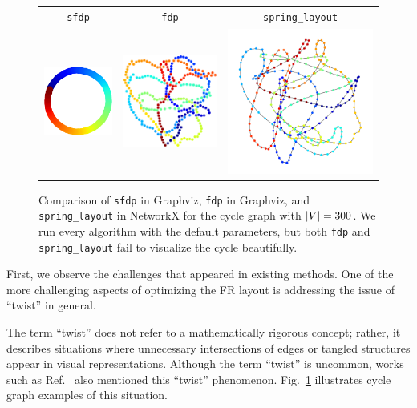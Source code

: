 \documentclass[dvipdfmx,journal]{IEEEtran}
\begin{document}
\begin{figure}[t]
  \centering
  \begin{tabular}{ccc}
    \texttt{sfdp}                                                   & \texttt{fdp} & \texttt{spring\_layout} \\
    \includegraphics[width=0.273\columnwidth]{cycle/cycle_sfdp.png} &
    \includegraphics[width=0.273\columnwidth]{cycle/cycle_fdp.png}  &
    \includegraphics[width=0.273\columnwidth]{cycle/cycle_fr.png}                                            \\
  \end{tabular}
  \caption{
    Comparison of \texttt{sfdp} in Graphviz, \texttt{fdp} in Graphviz, and \texttt{spring\_layout} in NetworkX for the cycle graph with $\abs{V} = 300$.
    We run every algorithm with the default parameters, but both \texttt{fdp} and \texttt{spring\_layout} fail to visualize the cycle beautifully.
  }
  \label{fig:cycle}
\end{figure}

First, we observe the challenges that appeared in existing methods.
One of the more challenging aspects of optimizing the FR layout is addressing the issue of ``twist'' in general.

The term ``twist'' does not refer to a mathematically rigorous concept; rather, it describes situations where unnecessary intersections of edges or tangled structures appear in visual representations.
Although the term ``twist'' is uncommon, works such as Ref.~\cite{cheongSnapshotVisualizationComplex2018} also mentioned this ``twist'' phenomenon. Fig.~\ref{fig:cycle} illustrates cycle graph examples of this situation.
\end{document}
